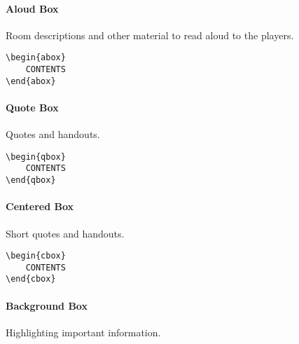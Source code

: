 \documentclass[itdr]{subfiles}
\begin{document}
\begin{abox}
	\paragraph{Aloud Box}
	Room descriptions and other material to read aloud to the players.\\
	\lipsum[66]\tight
\end{abox}

\skipline[0.25\baselineskip]

\begin{lstlisting}
\begin{abox}
	CONTENTS
\end{abox}
\end{lstlisting}

\vfill

\begin{qbox}
	\paragraph{Quote Box}
	Quotes and handouts.\\
	\lipsum[66]\tight
\end{qbox}

\skipline[0.25\baselineskip]

\begin{lstlisting}
\begin{qbox}
	CONTENTS
\end{qbox}
\end{lstlisting}

\vfill
\break

\begin{cbox}
	\paragraph{Centered Box}
	Short quotes and handouts.
\end{cbox}

\begin{lstlisting}
\begin{cbox}
	CONTENTS
\end{cbox}
\end{lstlisting}

\vfill

\begin{bbox}
	\paragraph{Background Box}
	Highlighting important information.\\
	\lipsum[66]
\end{bbox}
\end{document}
